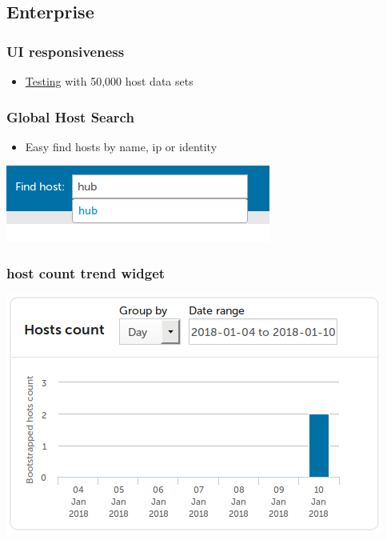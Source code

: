 \documentclass[11pt]{article}
\begin{document}
\subsection*{Enterprise}
\label{sec:org6d031ab}
\subsubsection*{UI responsiveness}
\label{sec:orgaf58ca2}
\begin{itemize}
\item \href{data/75/971753-cddb-4739-a0a1-dcb66df44ab9/alert-status-speed-comparison.webm}{Testing} with 50,000 host data sets
\end{itemize}

\subsubsection*{Global Host Search}
\label{sec:org8d7ab1b}
\begin{itemize}
\item Easy find hosts by name, ip or identity
\end{itemize}

\begin{center}
\includegraphics[width=.9\linewidth]{data/f9/7c9b4d-d46f-4aee-bd68-630f44106b0e/2018-01-14_Selection_002_2018-01-14_13-21-21.png}
\end{center}

\subsubsection*{host count trend widget}
\label{sec:orgef89f04}
\begin{center}
\includegraphics[width=.9\linewidth]{data/e9/0e4df9-0bb7-4a1e-84d5-25911497f93c/2018-01-10_Selection_001_2018-01-14_12-02-44.png}
\end{center}
\end{document}
